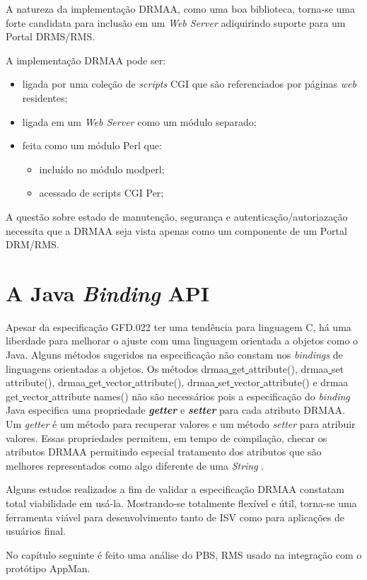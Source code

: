 A natureza da implementação DRMAA, como uma boa biblioteca, torna-se uma forte candidata para inclusão em um \emph{Web Server} adiquirindo suporte para um Portal DRMS/RMS.

A implementação DRMAA pode ser:

\begin{itemize}
	\item ligada por uma coleção de \emph{scripts} CGI que são referenciados por páginas \emph{web} residentes;
	\item ligada em um \emph{Web Server} como um módulo separado;
	\item feita como um módulo Perl que:
		\begin{itemize}
			\item incluído no módulo mod\underline{}perl;
			\item acessado de scripts CGI Per;
		\end{itemize}
\end{itemize}

A questão sobre estado de manutenção, segurança e autenticação/autoriazação necessita que a DRMAA seja vista apenas como um componente de um Portal DRM/RMS. 

\section{A Java \emph{Binding} API}

Apesar da especificação GFD.022 ter uma tendência para linguagem C, há uma liberdade para melhorar o ajuste com uma linguagem orientada a objetos como o Java. Alguns métodos sugeridos na especificação não constam nos \emph{bindings} de linguagens orientadas a objetos. Os métodos drmaa\underline{ }get\underline{ }attribute(), drmaa\underline{ }set\underline{ }attribute(), drmaa\underline{ }get\underline{ }vector\underline{ }attribute(), drmaa\underline{ }set\underline{ }vector\underline{ }attribute() e drmaa\underline{ }get\underline{ }vector\underline{ } attribute \underline{ }names() não são necessários pois a especificação do \emph{binding} Java especifica uma propriedade \emph{\textbf{getter}} e \emph{\textbf{setter}} para cada atributo DRMAA. Um \emph{getter} é um método para recuperar valores e um método \emph{setter} para atribuir valores. Essas propriedades permitem, em tempo de compilação, checar os atributos DRMAA permitindo especial tratamento dos atributos que são melhores representados como algo diferente de uma \emph{String} \cite{Templeton2003}.

Alguns estudos realizados \cite{Herrera2007, Templeton2006} a fim de validar a especificação DRMAA constatam total viabilidade em usá-la. Mostrando-se totalmente flexível e útil, torna-se uma ferramenta viável para desenvolvimento tanto de ISV como para aplicações de usuários final.

No capítulo seguinte é feito uma análise do PBS, RMS usado na integração com o protótipo AppMan.